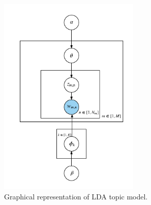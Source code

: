 \begin{figure}[h]
\centering
\includegraphics[width=0.6\textwidth]{figures/LDA.png}
\caption{Graphical representation of LDA topic model.}
\label{fig:lda}
\end{figure}

